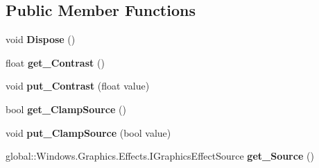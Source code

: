 \subsection*{Public Member Functions}
\begin{DoxyCompactItemize}
\item 
\mbox{\label{class_microsoft_1_1_graphics_1_1_canvas_1_1_effects_1_1_contrast_effect_a6f1bc711c2e2f43a2cdbf5f599a01945}} 
void {\bfseries Dispose} ()
\item 
\mbox{\label{class_microsoft_1_1_graphics_1_1_canvas_1_1_effects_1_1_contrast_effect_a140d08b77f0edc43a81972e67cc7bc4b}} 
float {\bfseries get\+\_\+\+Contrast} ()
\item 
\mbox{\label{class_microsoft_1_1_graphics_1_1_canvas_1_1_effects_1_1_contrast_effect_a23919ae56b418fe712468cc40f3e719a}} 
void {\bfseries put\+\_\+\+Contrast} (float value)
\item 
\mbox{\label{class_microsoft_1_1_graphics_1_1_canvas_1_1_effects_1_1_contrast_effect_adfdc196eeb8d4ab260ff8a02b91a232f}} 
bool {\bfseries get\+\_\+\+Clamp\+Source} ()
\item 
\mbox{\label{class_microsoft_1_1_graphics_1_1_canvas_1_1_effects_1_1_contrast_effect_aba9bdffcb03711ad9dcf51b730e58b8e}} 
void {\bfseries put\+\_\+\+Clamp\+Source} (bool value)
\item 
\mbox{\label{class_microsoft_1_1_graphics_1_1_canvas_1_1_effects_1_1_contrast_effect_a72dc5fce02408757eaba54af8a0d067c}} 
global\+::\+Windows.\+Graphics.\+Effects.\+I\+Graphics\+Effect\+Source {\bfseries get\+\_\+\+Source} ()
\item 
\mbox{\label{class_microsoft_1_1_graphics_1_1_canvas_1_1_effects_1_1_contrast_effect_a80a8fa221aef734932fecc91048e1ee8}} 

\end{DoxyCompactItemize}

